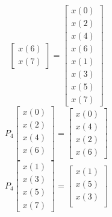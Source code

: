 \documentclass[journal,12pt,twocolumn]{IEEEtran}
\renewcommand\thesection{\arabic{section}}
\begin{document}
\begin{enumerate}[label=\arabic*.,ref=\thesection.\theenumi]
\begin{equation}
\begin{bmatrix}
                     x(6) \\
                     x(7)
                \end{bmatrix}
                =
                \begin{bmatrix}
                     x(0) \\
                     x(2) \\
                     x(4) \\
                     x(6) \\
                     x(1) \\
                     x(3) \\
                     x(5) \\
                     x(7)
                \end{bmatrix}
           \end{equation}
           \begin{equation}
                P_{4}
                \begin{bmatrix}
                     x(0) \\
                     x(2) \\
                     x(4) \\
                     x(6) \\
                \end{bmatrix}
                =
                \begin{bmatrix}
                     x(0) \\
                     x(4) \\
                     x(2) \\
                     x(6)
                \end{bmatrix}
           \end{equation}
           \begin{equation}
                P_{4}
                \begin{bmatrix}
                     x(1) \\
                     x(3) \\
                     x(5) \\
                     x(7)
                \end{bmatrix}
                =
                \begin{bmatrix}
                     x(1) \\
                     x(5) \\
                     x(3) \\

\end{bmatrix}
\end{equation}
\end{enumerate}
\end{document}
